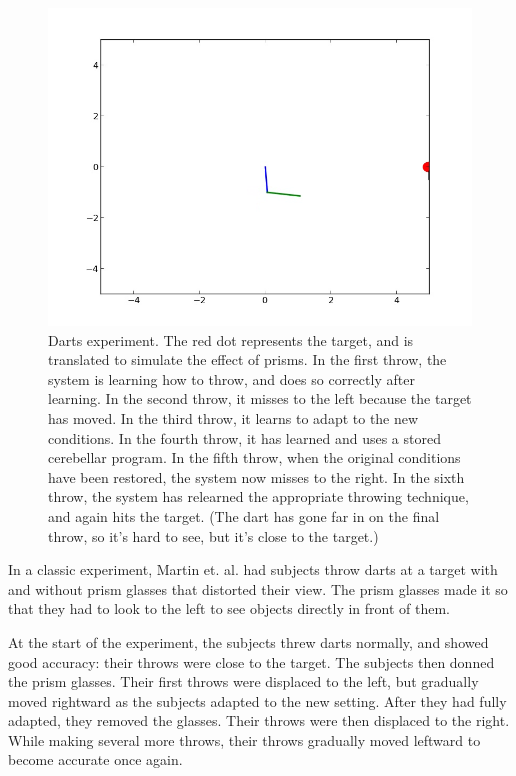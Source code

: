 \documentclass{article}
\theoremstyle{definition}
\begin{document}
\begin{figure}
\includegraphics[width=0.5\linewidth]{darts-ex/8_normal2_training.png}
\caption{Darts experiment. The red dot represents the target, and is
  translated to simulate the effect of prisms. In the first throw, the
  system is learning how to throw, and does so correctly after
  learning. In the second throw, it misses to the left because the
  target has moved. In the third throw, it learns to adapt to the new
  conditions. In the fourth throw, it has learned and uses a stored
  cerebellar program. In the fifth throw, when the original conditions
  have been restored, the system now misses to the right. In the sixth
  throw, the system has relearned the appropriate throwing technique,
  and again hits the target. (The dart has gone far in on the final
  throw, so it's hard to see, but it's close to the target.)}
\label{fig-darts2}
\end{figure}

In a classic experiment, Martin et. al. had subjects throw darts at a
target with and without prism glasses that distorted their view. The
prism glasses made it so that they had to look to the left to see
objects directly in front of them.

At the start of the experiment, the subjects threw darts normally, and
showed good accuracy: their throws were close to the target. The
subjects then donned the prism glasses. Their first throws were
displaced to the left, but gradually moved rightward as the subjects
adapted to the new setting. After they had fully adapted, they removed
the glasses. Their throws were then displaced to the right. While
making several more throws, their throws gradually moved leftward to
become accurate once again.
\end{document}
